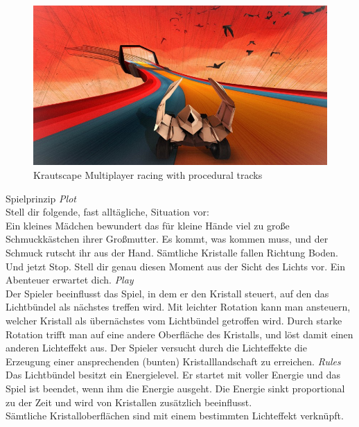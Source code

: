 {
	\begin{figure}
		\centering
		\includegraphics[width=\textwidth, height=0.7\textheight, keepaspectratio]{images/krautscape_ks1}
		\caption{Krautscape \linebreak Multiplayer racing with procedural tracks}
	\end{figure}
}

\slideonetoonetoone
{Spielprinzip}
{
	\emph{Plot}\\
	Stell dir folgende, fast alltägliche, Situation vor:\\
	Ein kleines Mädchen bewundert das für kleine Hände viel zu große Schmuckkästchen ihrer Großmutter. Es kommt, was kommen muss, und der Schmuck rutscht ihr aus der Hand. Sämtliche Kristalle fallen Richtung Boden. Und jetzt Stop. Stell dir genau diesen Moment aus der Sicht des Lichts vor. Ein Abenteuer erwartet dich.
}
{
	\pause
	\emph{Play}\\
	Der Spieler beeinflusst das Spiel, in dem er den Kristall steuert, auf den das Lichtbündel als nächstes treffen wird. Mit leichter Rotation kann man ansteuern, welcher Kristall als übernächstes vom Lichtbündel getroffen wird. Durch starke Rotation trifft man auf eine andere Oberfläche des Kristalls, und löst damit einen anderen Lichteffekt aus. Der Spieler versucht durch die Lichteffekte die Erzeugung einer ansprechenden (bunten) Kristalllandschaft zu erreichen.
}
{
	\pause
	\emph{Rules}\\
	Das Lichtbündel besitzt ein Energielevel. Er startet mit voller Energie und das Spiel ist beendet, wenn ihm die Energie ausgeht. Die Energie sinkt proportional zu der Zeit und wird von Kristallen zusätzlich beeinflusst.\\
	Sämtliche Kristalloberflächen sind mit einem bestimmten Lichteffekt verknüpft.
}

